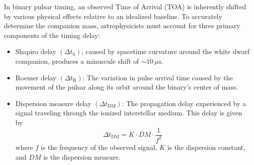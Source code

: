In binary pulsar timing, an observed Time of Arrival (TOA) is inherently
shifted by various physical effects relative to an idealized baseline. To
accurately determine the companion mass, astrophysicists must account for
three primary components of the timing delay:
\begin{itemize}
\item Shapiro delay $(\Delta t_{\mathrm{S}})$, caused by spacetime curvature
  around the white dwarf companion, produces a minuscule shift of
  $\sim 10\,\mu\mathrm{s}$.
\item Roemer delay $(\Delta t_{\mathrm{R}})$: The variation in pulse arrival
  time caused by the movement of the pulsar along its orbit around the
  binary's center of mass.
\item Dispersion measure delay $(\Delta t_{\mathrm{DM}})$: The propagation
  delay experienced by a signal traveling through the ionized interstellar
  medium. This delay is given by
  \[
  \Delta t_{\mathrm{DM}} = K \cdot DM \cdot \frac{1}{f^2}
  \]
  where $f$ is the frequency of the observed signal, $K$ is the dispersion
  constant, and $DM$ is the dispersion measure.
\end{itemize}

